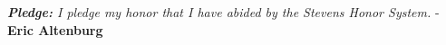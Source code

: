 \documentclass[11pt]{article}
\begin{document}
\newcommand\NAME{Eric Altenburg}  %
\newcommand\COURSE{CS-306}
\newcommand\HWNUM{1 \textit{Corrections}}              %
\newcommand{\bigO}{\mathcal{O}}


\begin{center}
	\textit{\textbf{Pledge:} I pledge my honor that I have abided by the Stevens Honor System.} - \textbf{\NAME}
\end{center}

\end{document}
